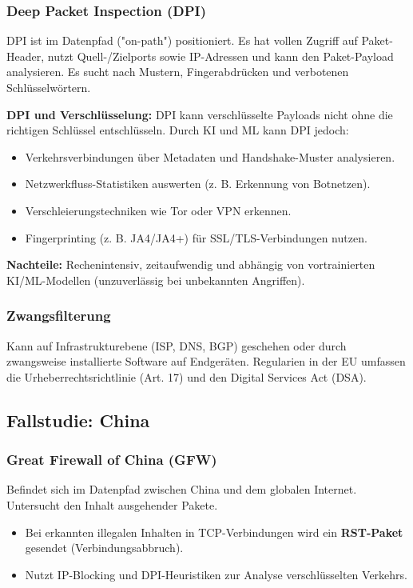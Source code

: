 \documentclass[
../../css_summary.tex,
]{subfiles}
\begin{document}
\subsubsection{Deep Packet Inspection (DPI)}
\begin{defbox}
  DPI ist im Datenpfad ("on-path") positioniert. Es hat vollen Zugriff auf Paket-Header, nutzt Quell-/Zielports sowie IP-Adressen und kann den Paket-Payload analysieren. Es sucht nach Mustern, Fingerabdrücken und verbotenen Schlüsselwörtern.
\end{defbox}

\textbf{DPI und Verschlüsselung:} DPI kann verschlüsselte Payloads nicht ohne die richtigen Schlüssel entschlüsseln. Durch KI und ML kann DPI jedoch:
\begin{itemize}
  \item Verkehrsverbindungen über Metadaten und Handshake-Muster analysieren.
  \item Netzwerkfluss-Statistiken auswerten (z. B. Erkennung von Botnetzen).
  \item Verschleierungstechniken wie Tor oder VPN erkennen.
  \item Fingerprinting (z. B. JA4/JA4+) für SSL/TLS-Verbindungen nutzen.
\end{itemize}
\textbf{Nachteile:} Rechenintensiv, zeitaufwendig und abhängig von vortrainierten KI/ML-Modellen (unzuverlässig bei unbekannten Angriffen).

\subsubsection{Zwangsfilterung}
Kann auf Infrastrukturebene (ISP, DNS, BGP) geschehen oder durch zwangsweise installierte Software auf Endgeräten. Regularien in der EU umfassen die Urheberrechtsrichtlinie (Art. 17) und den Digital Services Act (DSA).

\subsection{Fallstudie: China}

\subsubsection{Great Firewall of China (GFW)}
Befindet sich im Datenpfad zwischen China und dem globalen Internet. Untersucht den Inhalt ausgehender Pakete.
\begin{itemize}
  \item Bei erkannten illegalen Inhalten in TCP-Verbindungen wird ein \textbf{RST-Paket} gesendet (Verbindungsabbruch).
  \item Nutzt IP-Blocking und DPI-Heuristiken zur Analyse verschlüsselten Verkehrs.
\end{itemize}
\end{document}
